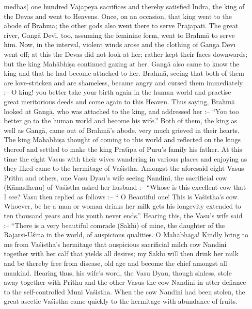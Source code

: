 medhas) one hundred V\=ajapeya sacrifices and thereby satisfied Indra, the king of the Devas and went to Heavens. Once, on an occasion, that king went to the abode of Brahm\=a; the other gods also went there to serve Praj\=apati. The great river, Gang\=a Dev\={\i}, too, assuming the feminine form, went to Brahm\=a to serve him. Now, in the interval, violent winds arose and the clothing of Gang\=a Dev\={\i} went off; at this the Devas did not look at her; rather kept their faces downwards; but the king Mah\=abhi\d{s}a continued gazing at her. Gang\=a also came to know the king and that he had become attached to her. Brahm\=a, seeing that both of them are love-stricken and are shameless, became angry and cursed them immediately :-- O king! you better take your birth again in the human world and practise great meritorious deeds and come again to this Heaven. Thus saying, Brahm\=a looked at Gang\=a, who was attached to the king, and addressed her :-- ``You too better go to the human world and become his wife.'' Both of them, the king as well as Gang\=a, came out of Brahm\=a's abode, very much grieved in their hearts. The king Mah\=abhi\d{s}a thought of coming to this world and reflected on the kings thereof and settled to make the king Prat\={\i}pa of Puru's family his father. At this time the eight Vasus with their wives wandering in various places and enjoying as they liked came to the hermitage of Va\'sistha. Amongst the aforesaid eight Vasus Prithu and others, one Vasu Dyau's wife seeing Nandini, the sacrificial cow (K\=amadhenu) of Va\'sistha asked her husband :-- ``Whose is this excellent cow that I see? Vasu then replied as follows :-- `` O Beautiful one! This is Va\'sistha's cow. Whoever, be he a man or woman drinks her milk gets his longevity extended to ten thousand years and his youth never ends.'' Hearing this, the Vasu's wife said :-- ``There is a very beautiful comrade (Sakh\={\i}) of mine, the daughter of the Rajars\={\i}-U\'s\={\i}na in the world, of auspicious qualities. O Mah\=abh\=aga! Kindly bring to me from Va\'sistha's hermitage that auspicious sacrificial milch cow Nandini together with her calf that yields all desires; my Sakh\={\i} will then drink her milk and be thereby free from disease, old age and become the chief amongst all mankind. Hearing thus, his wife's word, the Vasu Dyau, though sinless, stole away together with Prithu and the other Vasus the cow Nandini in utter defiance to the self-controlled Muni Va\'sistha. When the cow Nandini had been stolen, the great ascetic Va\'sistha came quickly to the hermitage with abundance of fruits.

